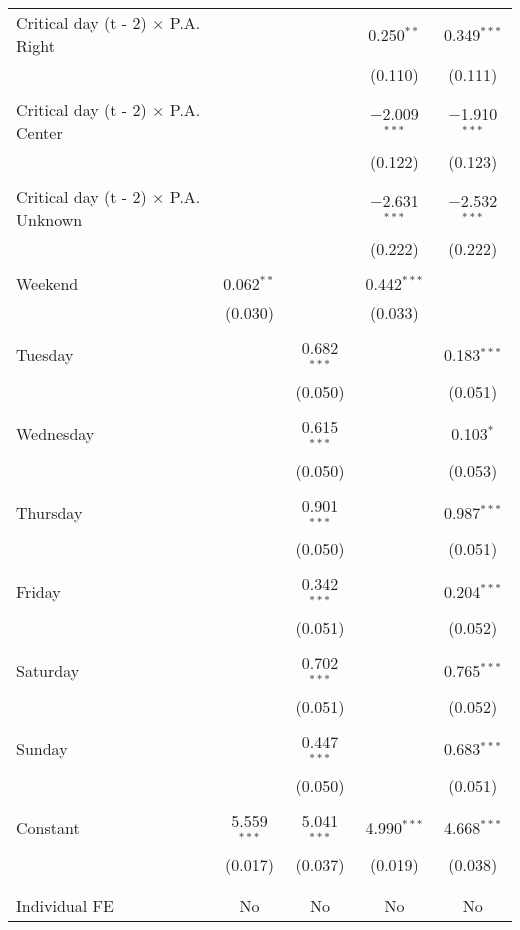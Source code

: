 \documentclass[
]{article}
\begin{document}
\begin{table}[!htbp]
{\begin{tabular}{@{\extracolsep{5pt}}lcccc}
 Critical day (t - 2) $\times$ P.A. Right &  &  & 0.250$^{**}$ & 0.349$^{***}$ \\ 
  &  &  & (0.110) & (0.111) \\ 
  & & & & \\ 
 Critical day (t - 2) $\times$ P.A. Center &  &  & $-$2.009$^{***}$ & $-$1.910$^{***}$ \\ 
  &  &  & (0.122) & (0.123) \\ 
  & & & & \\ 
 Critical day (t - 2) $\times$ P.A. Unknown &  &  & $-$2.631$^{***}$ & $-$2.532$^{***}$ \\ 
  &  &  & (0.222) & (0.222) \\ 
  & & & & \\ 
 Weekend & 0.062$^{**}$ &  & 0.442$^{***}$ &  \\ 
  & (0.030) &  & (0.033) &  \\ 
  & & & & \\ 
 Tuesday &  & 0.682$^{***}$ &  & 0.183$^{***}$ \\ 
  &  & (0.050) &  & (0.051) \\ 
  & & & & \\ 
 Wednesday &  & 0.615$^{***}$ &  & 0.103$^{*}$ \\ 
  &  & (0.050) &  & (0.053) \\ 
  & & & & \\ 
 Thursday &  & 0.901$^{***}$ &  & 0.987$^{***}$ \\ 
  &  & (0.050) &  & (0.051) \\ 
  & & & & \\ 
 Friday &  & 0.342$^{***}$ &  & 0.204$^{***}$ \\ 
  &  & (0.051) &  & (0.052) \\ 
  & & & & \\ 
 Saturday &  & 0.702$^{***}$ &  & 0.765$^{***}$ \\ 
  &  & (0.051) &  & (0.052) \\ 
  & & & & \\ 
 Sunday &  & 0.447$^{***}$ &  & 0.683$^{***}$ \\ 
  &  & (0.050) &  & (0.051) \\ 
  & & & & \\ 
 Constant & 5.559$^{***}$ & 5.041$^{***}$ & 4.990$^{***}$ & 4.668$^{***}$ \\ 
  & (0.017) & (0.037) & (0.019) & (0.038) \\ 
  & & & & \\ 
\hline \\[-1.8ex] 
Individual FE & No & No & No & No \\ 

\end{tabular}}
\end{table}
\end{document}

